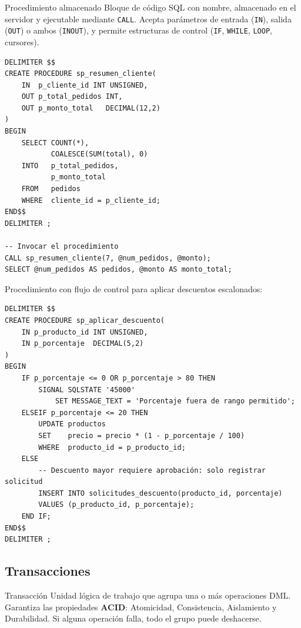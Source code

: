 \begin{definicion}{Procedimiento almacenado}
  Bloque de código SQL con nombre, almacenado en el servidor y ejecutable
  mediante \texttt{CALL}. Acepta parámetros de entrada (\texttt{IN}),
  salida (\texttt{OUT}) o ambos (\texttt{INOUT}), y permite estructuras de
  control (\texttt{IF}, \texttt{WHILE}, \texttt{LOOP}, cursores).
\end{definicion}

\begin{lstlisting}[style=sql, caption={Procedimiento con parámetros IN y OUT}]
DELIMITER $$
CREATE PROCEDURE sp_resumen_cliente(
    IN  p_cliente_id INT UNSIGNED,
    OUT p_total_pedidos INT,
    OUT p_monto_total   DECIMAL(12,2)
)
BEGIN
    SELECT COUNT(*),
           COALESCE(SUM(total), 0)
    INTO   p_total_pedidos,
           p_monto_total
    FROM   pedidos
    WHERE  cliente_id = p_cliente_id;
END$$
DELIMITER ;

-- Invocar el procedimiento
CALL sp_resumen_cliente(7, @num_pedidos, @monto);
SELECT @num_pedidos AS pedidos, @monto AS monto_total;
\end{lstlisting}

\begin{ejemplo}
  Procedimiento con flujo de control para aplicar descuentos escalonados:

\begin{lstlisting}[style=sql, caption={Stored procedure con IF / ELSEIF}]
DELIMITER $$
CREATE PROCEDURE sp_aplicar_descuento(
    IN p_producto_id INT UNSIGNED,
    IN p_porcentaje  DECIMAL(5,2)
)
BEGIN
    IF p_porcentaje <= 0 OR p_porcentaje > 80 THEN
        SIGNAL SQLSTATE '45000'
            SET MESSAGE_TEXT = 'Porcentaje fuera de rango permitido';
    ELSEIF p_porcentaje <= 20 THEN
        UPDATE productos
        SET    precio = precio * (1 - p_porcentaje / 100)
        WHERE  producto_id = p_producto_id;
    ELSE
        -- Descuento mayor requiere aprobación: solo registrar solicitud
        INSERT INTO solicitudes_descuento(producto_id, porcentaje)
        VALUES (p_producto_id, p_porcentaje);
    END IF;
END$$
DELIMITER ;
\end{lstlisting}
\end{ejemplo}

\subsection{Transacciones}

\begin{definicion}{Transacción}
  Unidad lógica de trabajo que agrupa una o más operaciones DML. Garantiza
  las propiedades \textbf{ACID}: Atomicidad, Consistencia, Aislamiento y
  Durabilidad. Si alguna operación falla, todo el grupo puede deshacerse.
\end{definicion}

